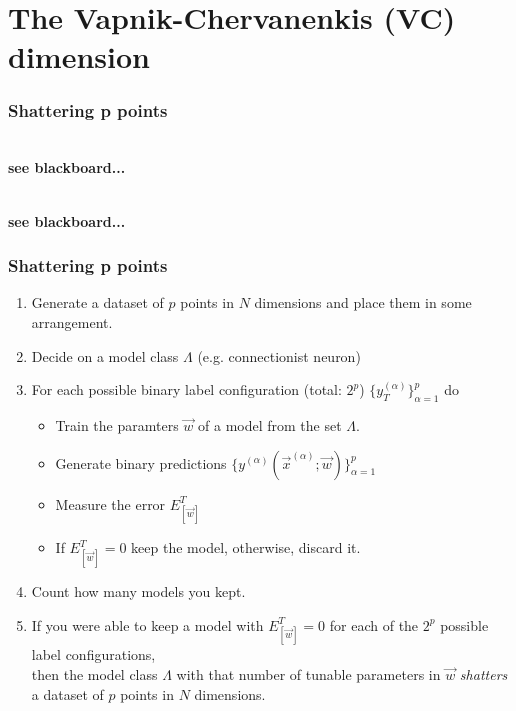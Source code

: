 \section{The Vapnik-Chervanenkis (VC) dimension}


\begin{frame}\frametitle{Shattering p points}

\\

\textbf{see blackboard...}


\\


\textbf{see blackboard...}

\end{frame}

\begin{frame}\frametitle{Shattering p points}

\begin{enumerate}
\item Generate a dataset of $p$ points in $N$ dimensions and place them in some arrangement.
\pause
\item Decide on a model class $\Lambda$ (e.g. connectionist neuron)
\pause
\item For each possible binary label configuration (total: $2^p$) $\{y_T^{(\alpha)}\}_{\alpha=1}^p$ do
	\begin{itemize}
	\item[] Train the paramters $\vec w$ of a model from the set $\Lambda$.
	\item[] Generate binary predictions $\{y^{(\alpha)}(\vec x^{(\alpha)}; \vec w)\}_{\alpha=1}^p$
	\item[] Measure the error $E^T_{[\vec w]}$
	\item[] If $E^T_{[\vec w]} = 0$ keep the model, otherwise, discard it. 
	\end{itemize}
\item Count how many models you kept.\\
\pause
\item[] If you were able to keep a model with $E^T_{[\vec w]} = 0$ for each of the $2^p$ possible label configurations,\\
then the model class $\Lambda$ with that number of tunable parameters in $\vec w$ \emph{shatters} a dataset of $p$ points in $N$ dimensions.
\end{enumerate}

\end{frame}

